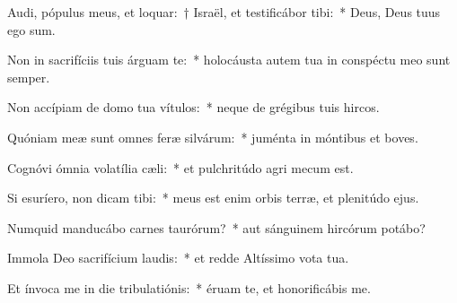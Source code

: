 
\item Audi, pópulus meus, et loquar:~† Israël, et testificábor tibi:~* Deus, Deus tuus ego sum.

\item Non in sacrifíciis tuis árguam te:~* holocáusta autem tua in conspéctu meo sunt semper.

\item Non accípiam de domo tua vítulos:~* neque de grégibus tuis hircos.

\item Quóniam meæ sunt omnes feræ silvárum:~* juménta in móntibus et boves.

\item Cognóvi ómnia volatília cæli:~* et pulchritúdo agri mecum est.

\item Si esuríero, non dicam tibi:~* meus est enim orbis terræ, et plenitúdo ejus.

\item Numquid manducábo carnes taurórum?~* aut sánguinem hircórum potábo?

\item Immola Deo sacrifícium laudis:~* et redde Altíssimo vota tua.

\item Et ínvoca me in die tribulatiónis:~* éruam te, et honorificábis me.
